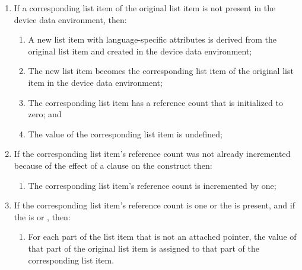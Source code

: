 \begin{enumerate}
\item If a corresponding list item of the original list item is not present 
      in the device data environment, then:

\begin{enumerate}
\item A new list item with language-specific attributes is derived from the 
      original list item and created in the device data environment;
\item The new list item becomes the corresponding list item of the original 
      list item in the device data environment;
\item The corresponding list item has a reference count that is initialized 
      to zero; and
\item The value of the corresponding list item is undefined;
\end{enumerate}

\item If the corresponding list item's reference count was not already incremented 
      because of the effect of a  clause on the construct then:
\begin{enumerate}
\item The corresponding list item's reference count is incremented by one;
\end{enumerate}

\item If the corresponding list item's reference count is one or the
        is present, and if the
       is  or , then:

\begin{enumerate}


\item For each part of the list item that is not an attached pointer, 
      the value of that part of the original list item is assigned to 
      that part of the corresponding list item.
\end{enumerate}
\end{enumerate}

